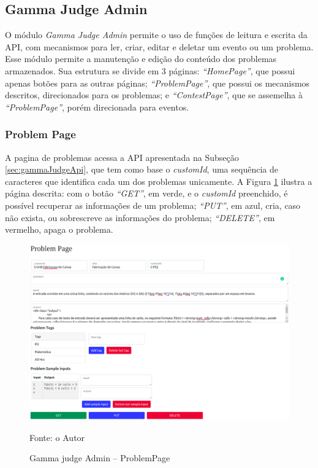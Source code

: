 \subsection{Gamma Judge Admin}
\label{sec:gamaJudgeAdmin}

O módulo \textit{Gamma Judge Admin} permite o uso de funções de leitura e escrita da API, com mecanismos para ler, criar, editar e deletar um evento ou um problema. Esse módulo permite a manutenção e edição do conteúdo dos problemas armazenados. Sua estrutura se divide em 3 páginas:\textit{ “HomePage”}, que possui apenas botões para as outras páginas; \textit{``ProblemPage''}, que possui os mecanismos descritos, direcionados para os problemas; e \textit{``ContestPage''}, que se assemelha à \textit{``ProblemPage''}, porém direcionada para eventos.

\subsubsection{Problem Page}

A pagina de problemas acessa a API apresentada na Subseção \ref{sec:gammaJudgeApi}, que tem como base o \textit{customId}, uma sequência de caracteres que identifica cada um dos problemas unicamente. A Figura \ref{fig:judge_admin_problem} ilustra a página descrita: com o botão \textit{``GET''}, em verde, e o \textit{customId} preenchido, é possível recuperar as informações de um problema; \textit{``PUT''}, em azul, cria, caso não exista, ou sobrescreve as informações do problema; \textit{``DELETE''}, em vermelho, apaga o problema.

\begin{figure}
    \centering
    \caption{Gamma judge Admin -- ProblemPage}
    \includegraphics[keepaspectratio=true,scale=0.32]{figuras/problem_page.eps}
    \label{fig:judge_admin_problem}
    
    \medskip
    Fonte: o Autor
    \medskip
\end{figure}

